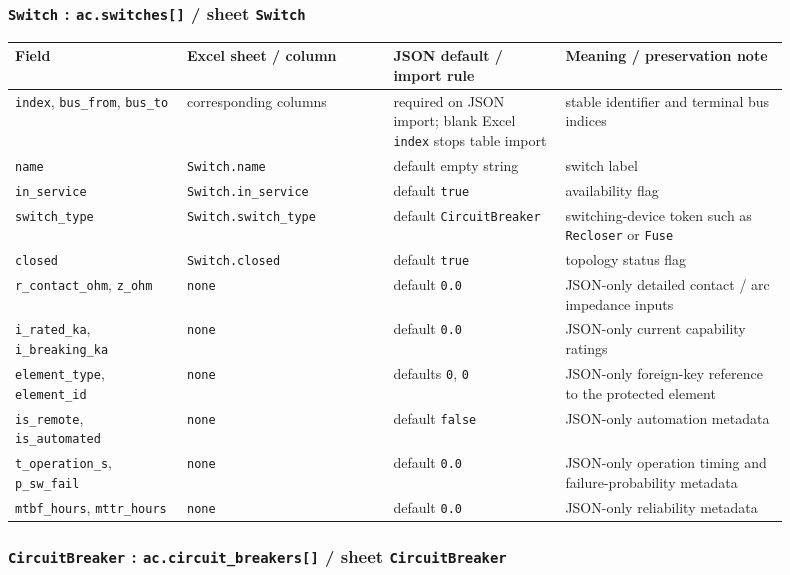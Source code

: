 \subsubsection*{\texttt{Switch} : \texttt{ac.switches[]} / sheet \texttt{Switch}}

\begin{longtable}{L{0.20\linewidth}L{0.24\linewidth}L{0.20\linewidth}L{0.26\linewidth}}
\toprule
Field & Excel sheet / column & JSON default / import rule & Meaning / preservation note \\
\midrule
\endhead
\texttt{index}, \texttt{bus\_from}, \texttt{bus\_to} & corresponding columns & required on JSON import; blank Excel \texttt{index} stops table import & stable identifier and terminal bus indices \\
\texttt{name} & \texttt{Switch.name} & default empty string & switch label \\
\texttt{in\_service} & \texttt{Switch.in\_service} & default \texttt{true} & availability flag \\
\texttt{switch\_type} & \texttt{Switch.switch\_type} & default \texttt{CircuitBreaker} & switching-device token such as \texttt{Recloser} or \texttt{Fuse} \\
\texttt{closed} & \texttt{Switch.closed} & default \texttt{true} & topology status flag \\
\texttt{r\_contact\_ohm}, \texttt{z\_ohm} & \texttt{none} & default \texttt{0.0} & JSON-only detailed contact / arc impedance inputs \\
\texttt{i\_rated\_ka}, \texttt{i\_breaking\_ka} & \texttt{none} & default \texttt{0.0} & JSON-only current capability ratings \\
\texttt{element\_type}, \texttt{element\_id} & \texttt{none} & defaults \texttt{0}, \texttt{0} & JSON-only foreign-key reference to the protected element \\
\texttt{is\_remote}, \texttt{is\_automated} & \texttt{none} & default \texttt{false} & JSON-only automation metadata \\
\texttt{t\_operation\_s}, \texttt{p\_sw\_fail} & \texttt{none} & default \texttt{0.0} & JSON-only operation timing and failure-probability metadata \\
\texttt{mtbf\_hours}, \texttt{mttr\_hours} & \texttt{none} & default \texttt{0.0} & JSON-only reliability metadata \\
\bottomrule
\end{longtable}

\subsubsection*{\texttt{CircuitBreaker} : \texttt{ac.circuit\_breakers[]} / sheet \texttt{CircuitBreaker}}

